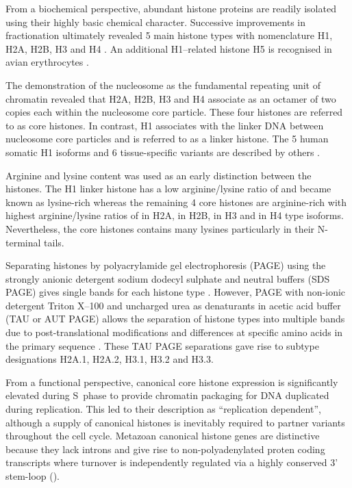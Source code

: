 	From a biochemical perspective, abundant histone proteins 
	are readily isolated using their highly basic chemical character. 
	Successive improvements in fractionation ultimately revealed 5 main histone types 
	with nomenclature H1, H2A, H2B, H3 and H4 \citep{nomenclature}.
	An additional H1--related histone H5 is recognised in avian erythrocytes \citep{HFive-review}.

	The demonstration of the nucleosome as the fundamental repeating unit of chromatin \citep{Kornberg1974} 
	revealed that H2A, H2B, H3 and H4 associate as an octamer of two copies each within the
	nucleosome core particle. These four histones are referred to as core histones. 
	In contrast, H1 associates with the linker DNA between nucleosome core particles 
	and is referred to as a linker histone. 
	The 5 human somatic H1 isoforms and 6 tissue-specific variants are described by others \citep{HarshmanFreitas2013}.

	Arginine and lysine content was used as an early distinction between the histones. 
	The H1 linker histone has a low arginine/lysine ratio of \LinkerArgLysRatio{} and became known as lysine-rich 
	whereas the remaining 4 core histones are arginine-rich 
	with highest arginine/lysine ratios of \HTwoAArgLysRatio{} in H2A, \HTwoBArgLysRatio{} in H2B, 
	\HThreeArgLysRatio{} in H3 and \HFourArgLysRatio{} in H4 type isoforms.
	Nevertheless, the core histones contains many lysines particularly in their N-terminal tails.

	Separating histones by polyacrylamide gel electrophoresis (PAGE) 
	using the strongly anionic detergent sodium dodecyl sulphate and neutral buffers (SDS PAGE) 
	gives single bands for each histone type \citep{ShechterHake2007}. 
	However, PAGE with non-ionic detergent Triton X--100 and uncharged urea as denaturants
	in acetic acid buffer (TAU or AUT PAGE) allows the separation of histone types into multiple bands 
	due to post-translational modifications and differences at specific amino acids 
	in the primary sequence \citep{Zweidler1977}. 
	These TAU PAGE separations gave rise to subtype designations H2A.1, H2A.2, H3.1, H3.2 and H3.3. 

	From a functional perspective, canonical core histone expression
	is significantly elevated during S~phase to provide chromatin packaging 
	for DNA duplicated during replication.
	This led to their description as ``replication dependent'', 
	although a supply of canonical histones is inevitably required 
	to partner variants throughout the cell cycle. 
	Metazoan canonical histone genes are distinctive 
	because they lack introns and give rise to non-polyadenylated proten coding transcripts 
	where turnover is independently regulated via a highly conserved 3' stem-loop ().

